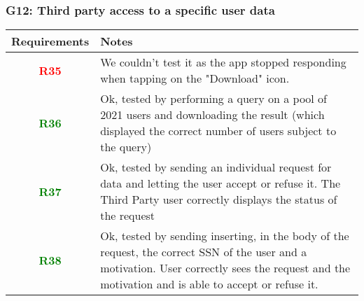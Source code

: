 \subsubsection{G12: Third party access to a specific user data}
  \begin{adjustwidth}{1cm}{}
        \begin{longtable}{|c|p{}|}
            \hline
            \textbf{Requirements} & \textbf{Notes} \\
            \hline
            \textbf{\textcolor{red}{R35}} & We couldn't test it as the app stopped responding when tapping on the "Download" icon.  \\
            \hline
            \textbf{\textcolor{green}{R36}} &  Ok, tested by performing a query on a pool of 2021 users and downloading the result (which displayed the correct number of users subject to the query) \\
            \hline
            \textbf{\textcolor{green}{R37}} & Ok, tested by sending an individual request for data and letting the user accept or refuse it. The Third Party user correctly displays the status of the request  \\
            \hline
            \textbf{\textcolor{green}{R38}} & Ok, tested by sending inserting, in the body of the request, the correct SSN of the user and a motivation. User correctly sees the request and the motivation and is able to accept or refuse it.  \\
            \hline
            
            
            
        \end{longtable}
    \end{adjustwidth}
    

